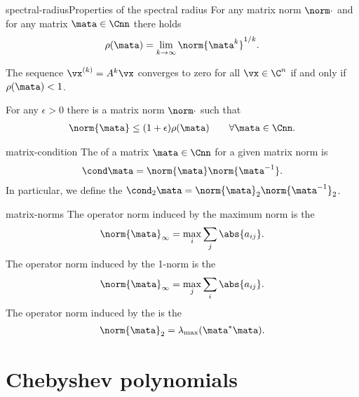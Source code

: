 \begin{Lemma*}{spectral-radius}{Properties of the spectral radius}
  For any matrix norm $\norm\cdot$ and for any matrix $\mata\in\Cnn$ there holds
  \begin{gather}
    \rho(\mata) = \lim_{k\to\infty} \norm{\mata^k}^{1/k}.
  \end{gather}

  The sequence $\vx^{(k)} = A^k\vx$ converges to zero for all
  $\vx\in\C^n$ if and only if $\rho(\mata)<1$.

  For any $\epsilon>0$
  there is a matrix norm $\norm\cdot$ such that
  \begin{gather}
    \norm{\mata} \le (1+\epsilon) \rho(\mata) \qquad \forall \mata\in\Cnn.
  \end{gather}
\end{Lemma*}

\begin{Definition}{matrix-condition}
  The  of a matrix $\mata\in\Cnn$ for a given
  matrix norm is
  \begin{gather*}
    \cond\mata = \norm{\mata}\norm{\mata^{-1}}.
  \end{gather*}
  In particular, we define the 
 $\cond_2\mata = \norm{\mata}_2\norm{\mata^{-1}}_2$.
\end{Definition}

\begin{Example}{matrix-norms}
  The operator norm induced by the maximum norm is the 
  \begin{gather}
    \norm{\mata}_\infty = \max_i \sum_j \abs{a_{ij}}.
  \end{gather}
  The operator norm induced by the 1-norm is the 
  \begin{gather}
    \norm{\mata}_\infty = \max_j \sum_i \abs{a_{ij}}.
  \end{gather}
  The operator norm induced by the  is the 
  \begin{gather}
    \norm{\mata}_2 = \lambda_{\max}(\mata^*\mata).
  \end{gather}
\end{Example}

\section{Chebyshev polynomials}


\nocite{Rannacher18nla}


\printindex

